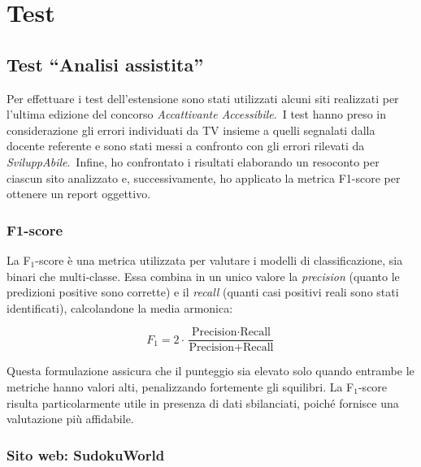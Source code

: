 \chapter{Test}
\label{chap:test}

\section{Test ``Analisi assistita''}
\noindent Per effettuare i test dell’estensione sono stati utilizzati alcuni siti realizzati per l’ultima edizione del concorso \textit{Accattivante Accessibile}.\
I test hanno preso in considerazione gli errori individuati da TV insieme a quelli segnalati dalla docente referente e sono stati messi a confronto con gli errori rilevati da \textit{SviluppAbile}.\
Infine, ho confrontato i risultati elaborando un resoconto per ciascun sito analizzato e, successivamente, ho applicato la metrica F1-score per ottenere un report oggettivo.

\subsection{F1-score} 
\noindent La F$_1$-score è una metrica utilizzata per valutare i modelli di classificazione, sia binari che multi‐classe. 
Essa combina in un unico valore la \textit{precision} (quanto le predizioni positive sono corrette) e il \textit{recall} (quanti casi positivi reali sono stati identificati), calcolandone la media armonica:

\[
F_{1} = 2 \cdot \frac{\text{Precision} \cdot \text{Recall}}{\text{Precision} + \text{Recall}}
\]

\noindent Questa formulazione assicura che il punteggio sia elevato solo quando entrambe le metriche hanno valori alti, penalizzando fortemente gli squilibri. 
La F$_1$-score risulta particolarmente utile in presenza di dati sbilanciati, poiché fornisce una valutazione più affidabile.

\subsection{Sito web: SudokuWorld}

